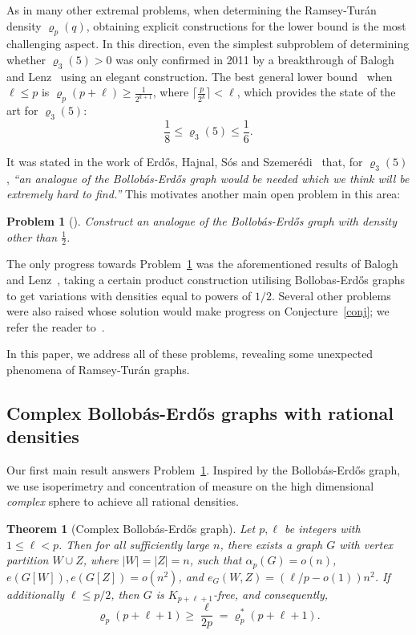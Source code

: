 \documentclass[10pt,a4paper]{article}
\newtheorem{theorem}{Theorem}[section]
\newtheorem{probx}[conjx]{Problem}
\theoremstyle{definition}
\begin{document}
As in many other extremal problems, when determining the Ramsey-Tur\'an density $\varrho_p(q)$, obtaining explicit constructions for the lower bound is the most challenging aspect. In this direction, even the simplest subproblem of determining whether $\varrho_3(5)>0$ was only confirmed in 2011 by a breakthrough of Balogh and Lenz~\cite{BL-1} using an elegant construction. The best general lower bound~\cite{BL-2} when $\ell\le p$ is $\varrho_p(p+\ell)\ge \frac{1}{2^{k+1}}$, where $\lceil \frac{p}{2^k}\rceil<\ell$, which provides the state of the art for $\varrho_3(5)$:
\begin{equation*}%
	\frac{1}{8}\le \varrho_3(5)\le \frac{1}{6}.
\end{equation*}


It was stated in the work of Erd\H{o}s, Hajnal, S\'os and Szemer\'edi~\cite{EHSSz} that, for $\varrho_3(5)$, \emph{``an analogue of the Bollob\'as-Erd\H{o}s graph would be needed which we think will be extremely hard to find.''} This motivates another main open problem in this area:
\begin{probx}[\cite{BL-1,EHSSz}]\label{problem-BE}
	Construct an analogue of the Bollob\'as-Erd\H{o}s graph with density other than $\frac{1}{2}$.
\end{probx}

The only progress towards Problem~\ref{problem-BE} was the aforementioned results of Balogh and Lenz~\cite{BL-1,BL-2}, taking a certain product construction utilising Bollobas-Erd\H{o}s graphs to get variations with densities equal to powers of $1/2$.
Several other problems were also raised whose solution would make progress on Conjecture~\ref{conj}; we refer the reader to~\cite{BL-2,EHSSSz}.

\medskip

In this paper, we address all of these problems, revealing some unexpected phenomena of Ramsey-Tur\'an graphs.

\subsection{Complex Bollob\'as-Erd\H{o}s graphs with rational densities}
Our first main result answers Problem~\ref{problem-BE}.
Inspired by the Bollob\'as-Erd\H{o}s graph, we use isoperimetry and concentration of measure on the high dimensional \emph{complex} sphere to achieve all rational densities.

\begin{theorem}[Complex Bollob\'as-Erd\H{o}s graph]\label{GBE}
	Let $p,\ell$ be integers with $1 \leq \ell <p $. Then for all sufficiently large $n$,  there exists a graph $G$ with vertex partition $W \cup Z$, where $|W|=|Z|=n$, such that $\alpha_p(G) =o(n)$, $e(G[W]), e(G[Z])=o(n^2)$, and $e_G(W,Z) = (\ell/p-o(1))n^2$. If additionally $\ell\le p/2$, then $G$ is $K_{p+\ell+1}$-free, and consequently,
	$$\varrho_p(p+\ell+1) \geq \frac{\ell}{2p} = \varrho_p^*(p+\ell+1).$$
\end{theorem}
\end{document}

